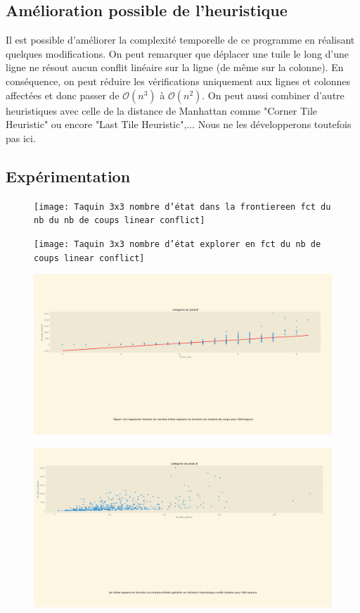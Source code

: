 \documentclass[a4paper, 12pt]{article}
\begin{document}
\subsection{Amélioration possible de l'heuristique}
Il est possible d'améliorer la complexité temporelle de ce programme en réalisant quelques modifications. On peut remarquer que déplacer une tuile le long d'une ligne ne résout aucun conflit linéaire sur la ligne (de même sur la colonne). En conséquence, on peut réduire les vérifications uniquement aux lignes et colonnes affectées et donc passer de $\mathcal{O}(n^{3})$ à $\mathcal{O}(n^{2})$.
On peut aussi combiner d'autre heuristiques avec celle de la distance de Manhattan comme "Corner Tile Heuristic" ou encore "Last Tile Heuristic",... Nous ne les développerons toutefois pas ici.

\subsection{Expérimentation}
\begin{figure}[H]
    \centering
    \texttt{[image: Taquin 3x3 nombre d'état dans la frontiereen fct du nb du nb de coups linear conflict]}
\end{figure}
\begin{figure}[H]
    \centering
    \texttt{[image: Taquin 3x3 nombre d'état explorer en fct du nb de coups linear conflict]}
\end{figure}
\begin{figure}[H]
    \centering
    \includegraphics[width=\textwidth]{Taquin 3x3 nombre d'etat explorer en fct du nb de coups reg lineaire Linear conflict}
\end{figure}
\begin{figure}[H]
    \centering
    \includegraphics[width=\textwidth]{Taquin 3x3 nombre d'etat explorer en fct du nb de detat generer linear conflict}
\end{figure}
\end{document}
